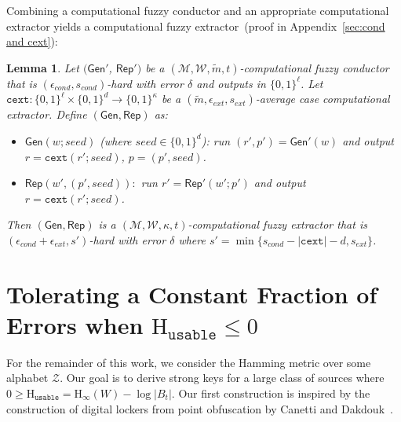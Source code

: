 \documentclass[11pt]{article}
\newcommand{\apref}[1]{\mbox{Appendix~\ref{#1}}}
\newcommand{\class}[1]{{\ensuremath{\mathsf{#1}}}}
\newcommand{\gen}{\ensuremath{\class{Gen}}\xspace}
\newcommand{\rep}{\ensuremath{\class{Rep}}\xspace}
\newcommand{\zo}{\ensuremath{\{0, 1\}}}
\newcommand{\Hoo}{\mathrm{H}_\infty}
\newcommand{\Huse}{\mathrm{H}_{\mathtt{usable}}}
\newcommand{\cext}{\ensuremath{\mathtt{cext}}}
\newtheorem{lemma}[theorem]{Lemma}
\begin{document}
Combining a computational fuzzy conductor and an appropriate computational extractor yields a computational fuzzy extractor~(proof in \apref{sec:cond and cext}):

\begin{lemma}
\label{lem:cond and cext}
Let $(\gen'$, $\rep')$ be a $(\mathcal{M}, \mathcal{W}, \tilde{m}, t)$-computational fuzzy conductor that is $(\epsilon_{cond}, s_{cond})$-hard with error $\delta$ and outputs in $\zo^\ell$.  Let $\cext:\zo^\ell\times \zo^d\rightarrow \zo^\kappa$ be a $(\tilde{m}, \epsilon_{ext}, s_{ext})$-average case computational extractor.  Define $(\gen, \rep)$ as:
\begin{itemize}
\item $\gen(w; seed)$ (where $seed\in \zo^d$): run $(r', p')= \gen'(w)$ and output $r = \cext(r'; seed)$, $p = (p', seed)$.
\item $\rep(w', (p', seed)):$ run $r' = \rep'(w'; p')$ and output $r = \cext(r'; seed)$.
\end{itemize}
Then $(\gen, \rep)$ is a $(\mathcal{M}, \mathcal{W}, \kappa, t)$-computational fuzzy extractor that is $(\epsilon_{cond}+\epsilon_{ext}, s')$-hard with error $\delta$ where $s' = \min\{s_{cond} - |\cext| -d, s_{ext}\}$.
\end{lemma}


\section{Tolerating a Constant Fraction of Errors when $\Huse\le 0$}
\label{sec:construction}
For the remainder of this work, we consider the Hamming metric over some alphabet $\mathcal{Z}$.  Our goal is to derive strong keys for a large class of sources where $0\ge \Huse = \Hoo(W) - \log|B_t|$.
Our first construction is inspired by the construction of digital lockers from point obfuscation by Canetti and Dakdouk~\cite{canetti2008obfuscating}.
\end{document}
